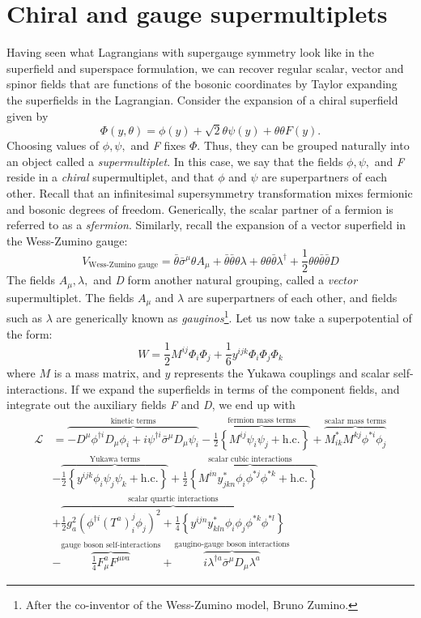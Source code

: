 \section{Chiral and gauge supermultiplets}
Having seen what Lagrangians with supergauge symmetry look like in the superfield and superspace formulation, we can recover regular scalar, vector and spinor fields that are functions of the bosonic coordinates by Taylor expanding the superfields in the Lagrangian. Consider the expansion of a chiral superfield given by
\[\Phi(y,\theta) = \phi(y) + \sqrt{2}\theta\psi(y)+\theta\theta F(y).\]
Choosing values of $\phi,\psi,$ and \emph{F} fixes $\Phi$. Thus, they can be grouped naturally into an object called a \emph{supermultiplet}. In this case, we say that the fields $\phi,\psi,$ and \emph{F} reside in a \emph{chiral} supermultiplet, and that $\phi$ and $\psi$ are superpartners of each other. Recall that an infinitesimal supersymmetry transformation mixes fermionic and bosonic degrees of freedom. Generically, the scalar partner of a fermion is referred to as a \emph{sfermion}. Similarly, recall the expansion of a vector superfield in the Wess-Zumino gauge:
\[V_\text{Wess-Zumino gauge} = \bar{\theta}\bar{\sigma}^\mu\theta A_\mu+\bar{\theta}\bar{\theta}\theta\lambda+\theta\theta\bar{\theta}\lambda^\dagger+\frac{1}{2}\theta\theta\bar{\theta}\bar{\theta}D\]
The fields $A_\mu,\lambda,$ and \emph{D} form another natural grouping, called a \emph{vector} supermultiplet. The fields $A_\mu$ and $\lambda$ are superpartners of each other, and fields such as $\lambda$ are generically known as \emph{gauginos}\footnote{After the co-inventor of the Wess-Zumino model, Bruno Zumino.}.
Let us now take a superpotential of the form:
\begin{equation}
W = \frac{1}{2}M^{ij}\Phi_i\Phi_j + \frac{1}{6}y^{ijk}\Phi_i\Phi_j\Phi_k
\label{eq:superpotential}
\end{equation}
where $M$ is a mass matrix, and $y$ represents the Yukawa couplings and scalar self-interactions.
If we expand the superfields in terms of the component fields, and integrate out the auxiliary fields \emph{F} and \emph{D}, we end up with
\begin{align*}
  \mathcal{L} &= \overbrace{-D^\mu\phi^{\dagger i}D_\mu\phi_i + i\psi^{\dagger i}\bar{\sigma}^\mu D_\mu\psi_i}^\text{kinetic terms}
  -\overbrace{\frac{1}{2}\left\{M^{ij}\psi_i\psi_j+\text{h.c.}\right\}}^{\text{fermion mass terms}}
   +\overbrace{M_{ik}^*M^{kj}\phi^{*i}\phi_j}^\text{scalar mass terms}\\
  &-\overbrace{\frac{1}{2}\left\{y^{ijk}\phi_i\psi_j\psi_k+\text{h.c.}\right\}}^{\text{Yukawa terms}}
  +\overbrace{\frac{1}{2}\left\{M^{in}y_{jkn}^*\phi_i\phi^{*j}\phi^{*k}+\text{h.c.}\right\}}^\text{scalar cubic interactions}\\
  &+\overbrace{\frac{1}{2}g_a^2(\phi^{\dagger i}(T^a)_i^j\phi_j)^2+\frac{1}{4}\left\{y^{ijn}y_{kln}^*\phi_i\phi_j\phi^{*k}\phi^{*l}\right\}}^\text{scalar quartic interactions}\\
  &-\overbrace{\frac{1}{4}F_{\mu}^aF^{\mu\nu a}}^\text{gauge boson self-interactions}
  +\overbrace{i\lambda^{\dagger a}\bar{\sigma}^\mu D_\mu\lambda^a}^\text{gaugino-gauge boson interactions}
\end{align*}
